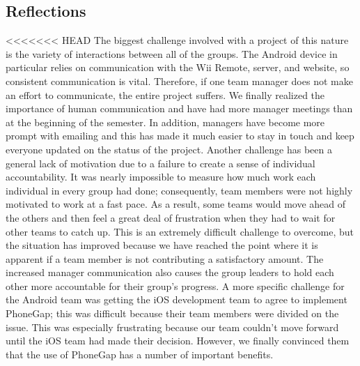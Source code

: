 \documentclass[12pt]{article}
\begin{document}
\begin{itemize}
\section{Reflections}
\label{sec:reflections}
<<<<<<< HEAD
The biggest challenge involved with a project of this nature is the variety of interactions between all of the groups.  The Android device in particular relies on communication with the Wii Remote, server, and website, so consistent communication is vital.  Therefore, if one team manager does not make an effort to communicate, the entire project suffers.  We finally realized the importance of human communication and have had more manager meetings than at the beginning of the semester.  In addition, managers have become more prompt with emailing and this has made it much easier to stay in touch and keep everyone updated on the status of the project.  Another challenge has been a general lack of motivation due to a failure to create a sense of individual accountability.  It was nearly impossible to measure how much work each individual in every group had done; consequently, team members were not highly motivated to work at a fast pace.  As a result, some teams would move ahead of the others and then feel a great deal of frustration when they had to wait for other teams to catch up.  This is an extremely difficult challenge to overcome, but the situation has improved because we have reached the point where it is apparent if a team member is not contributing a satisfactory amount.  The increased manager communication also causes the group leaders to hold each other more accountable for their group’s progress.  A more specific challenge for the Android team was getting the iOS development team to agree to implement PhoneGap; this was difficult because their team members were divided on the issue.  This was especially frustrating because our team couldn’t move forward until the iOS team had made their decision.  However, we finally convinced them that the use of PhoneGap has a number of important benefits.


\end{itemize}
\end{document}

